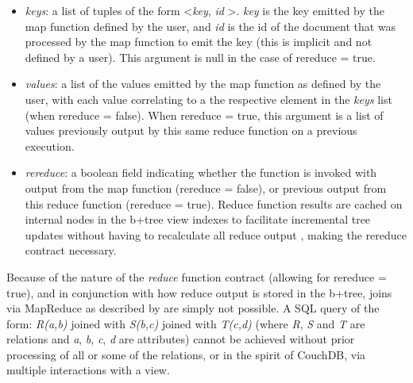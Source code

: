 \begin{itemize}
    \item \textit{keys}: a list of tuples of the form \textless \textit{key}, \textit{id} \textgreater. \textit{key} is the key emitted by the map function defined by the user, and \textit{id} is the id of the document that was processed by the map function to emit the key (this is implicit and not defined by a user). This argument is null in the case of rereduce = true.
    \item \textit{values}: a list of the values emitted by the map function as defined by the user, with each value correlating to a the respective element in the \textit{keys} list (when rereduce = false). When rereduce = true, this argument is a list of values previously output by this same reduce function on a previous execution.
    \item \textit{rereduce}: a boolean field indicating whether the function is invoked with output from the map function (rereduce = false), or previous output from this reduce function (rereduce = true). Reduce function results are cached on internal nodes in the b+tree view indexes to facilitate incremental tree updates without having to recalculate all reduce output \cite{slack25Oct}, making the rereduce contract necessary.
\end{itemize}

Because of the nature of the \textit{reduce} function contract (allowing for rereduce = true), and in conjunction with how reduce output is stored in the b+tree, joins via MapReduce as described by \cite{chandar2010} are simply not possible. A SQL query of the form: \textit{R(a,b)} joined with \textit{S(b,c)} joined with \textit{T(c,d)} (where \textit{R}, \textit{S} and \textit{T} are relations and \textit{a}, \textit{b}, \textit{c}, \textit{d} are attributes) cannot be achieved without prior processing of all or some of the relations, or in the spirit of CouchDB, via multiple interactions with a view.

